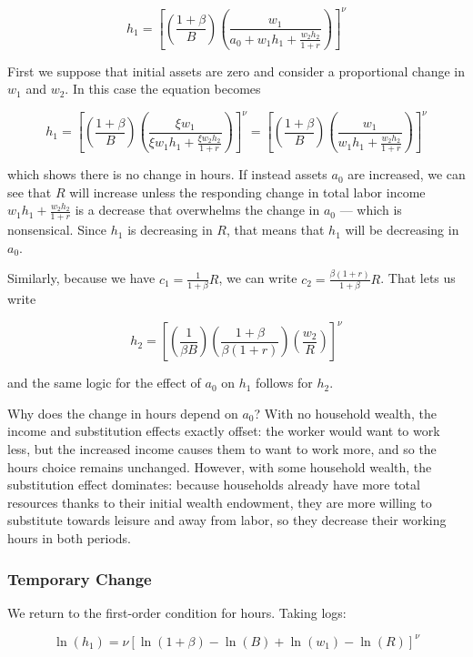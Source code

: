 \documentclass[12pt, letterpaper, parskip = full]{article}
\begin{document}
    \[  h_1 = \left[ \left(\frac{1+\beta}{B}\right) \left(\frac{w_1}{ a_0 + w_1 h_1 + \frac{w_2 h_2}{1+r} }\right)  \right]^\nu   \]

    First we suppose that initial assets are zero and consider a proportional change in \(w_1\) and \(w_2\). In this case the equation becomes 

    \[  h_1 = \left[ \left(\frac{1+\beta}{B}\right) \left(\frac{ \xi w_1}{ \xi w_1 h_1 + \frac{ \xi w_2 h_2}{1+r} }\right)  \right]^\nu = \left[ \left(\frac{1+\beta}{B}\right) \left(\frac{w_1}{ w_1 h_1 + \frac{w_2 h_2}{1+r} }\right)  \right]^\nu  \]

    which shows there is no change in hours. If instead assets \(a_0\) are increased, we can see that \(R\) will increase unless the responding change in total labor income \(w_1 h_1 + \frac{w_2 h_2}{1+r}\) is a decrease that overwhelms the change in \(a_0\) --- which is nonsensical. Since \(h_1\) is decreasing in \(R\), that means that \(h_1\) will be decreasing in \(a_0\). 
    
    Similarly, because we have \(c_1 = \frac{1}{1+\beta} R\), we can write \(c_2 = \frac{\beta (1+r)}{1 + \beta} R\). That lets us write

    \[  h_2 = \left[ \left(\frac{1}{\beta B}\right) \left(\frac{1+\beta}{\beta(1+r)}\right) \left( \frac{w_2}{R} \right) \right]^\nu   \]

    and the same logic for the effect of \(a_0\) on \(h_1\) follows for \(h_2\). 

    Why does the change in hours depend on \(a_0\)? With no household wealth, the income and substitution effects exactly offset: the worker would want to work less, but the increased income causes them to want to work more, and so the hours choice remains unchanged. However, with some household wealth, the substitution effect dominates: because households already have more total resources thanks to their initial wealth endowment, they are more willing to substitute towards leisure and away from labor, so they decrease their working hours in both periods.

    \subsubsection{Temporary Change}

    We return to the first-order condition for hours. Taking logs:

    \[ \ln(h_1) = \nu \left[\ln(1+\beta) - \ln(B) + \ln(w_1) - \ln(R) \right]  ^\nu   \]
\end{document}
